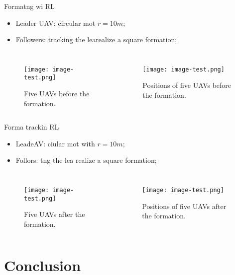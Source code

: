 \documentclass[table,aspectratio=1610]{beamer}%
\begin{document}
\begin{frame}{Formatng wi RL}
	\begin{itemize}
		\item Leader UAV: \alert{circular} mot $ r=10m $;
		\item Followers: tracking the learealize a square formation;
	\end{itemize}
	\begin{columns}
		\pause 
		\begin{figure}
			\centering
			\texttt{[image: image-test.png]}
			\caption{Five UAVs \alert{before} the formation.}
		\end{figure}
	
		\begin{figure}
			\centering
			\texttt{[image: image-test.png]}
			\caption{Positions of five UAVs \alert{before} the formation.}
		\end{figure}
	\end{columns}
\end{frame}

\begin{frame}{Forma trackin RL}
	\begin{itemize}
		\item LeadeAV: \alert{ciular} mot with $ r=10m $;
		\item Follors: tng the lea realize a square formation;
	\end{itemize}
	\begin{columns}
		\pause
		\column[c]{.4\textwidth}
		\begin{figure}
			\centering
			\texttt{[image: image-test.png]}
			\caption{Five UAVs \alert{after} the formation.}
		\end{figure}
		
		\column[c]{.45\textwidth}
		\begin{figure}
			\centering
			\texttt{[image: image-test.png]}
			\caption{Positions of five UAVs \alert{after} the formation.}
		\end{figure}
	\end{columns}
\end{frame}

\section{Conclusion}
\end{document}
